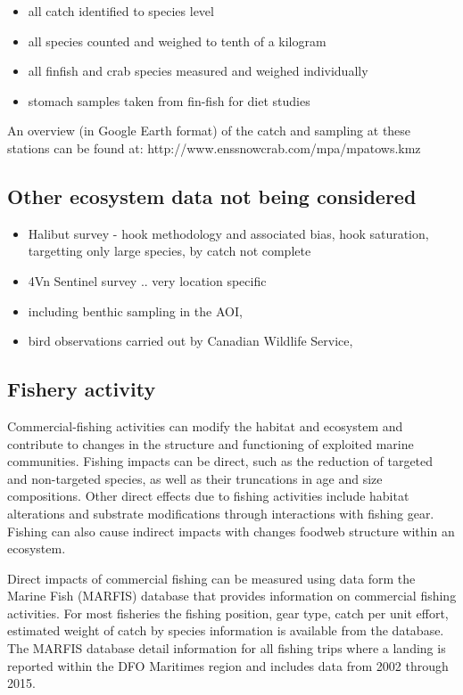 \documentclass[letterpaper,portrait,11pt]{scrartcl}
\numberwithin{equation}{section}		%
\numberwithin{figure}{section}			%
\numberwithin{table}{section}				%
\begin{document}
\begin{itemize}
  \item all catch identified to species level
  \item all species counted and weighed to tenth of a kilogram
  \item all finfish and crab species measured and weighed individually
  \item stomach samples taken from fin-fish for diet studies
\end{itemize}

An overview (in Google Earth format) of the catch and sampling at these stations can be found at: http://www.enssnowcrab.com/mpa/mpatows.kmz

\subsection{Other ecosystem data not being considered}
\begin{itemize}
   \item Halibut survey - hook methodology and associated bias, hook saturation, targetting only large species, by catch not complete 
   \item 4Vn Sentinel survey .. very location specific
   \item including benthic sampling in the AOI, 
   \item bird observations carried out by Canadian Wildlife Service, 
\end{itemize}	
  

\subsection{Fishery activity}
Commercial-fishing activities can modify the habitat and ecosystem and contribute to changes in the structure and functioning of exploited marine communities.  Fishing impacts can be direct, such as the reduction of targeted and non-targeted species, as well as their truncations in age and size compositions.  Other direct effects due to fishing activities include habitat alterations and substrate modifications through interactions with fishing gear.  Fishing can also cause indirect impacts with changes foodweb structure within an ecosystem.  

Direct impacts of commercial fishing can be measured using data form the Marine Fish (MARFIS) database that provides information on commercial fishing activities.  For most fisheries the fishing position, gear type, catch per unit effort, estimated weight of catch by species information is available from the database. The MARFIS database detail information for all fishing trips where a landing is reported within the DFO Maritimes region and includes data from 2002 through 2015.  
\end{document}

